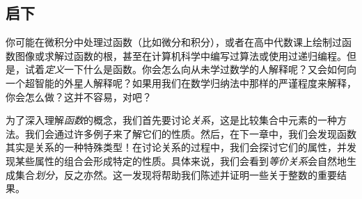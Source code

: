 
\subsection{启下}

你可能在微积分中处理过函数（比如微分和积分），或者在高中代数课上绘制过函数图像或求解过函数的根，甚至在计算机科学中编写过算法或使用过递归编程。但是，试着\emph{定义}一下什么是函数。你会怎么向从未学过数学的人解释呢？又会如何向一个超智能的外星人解释呢？如果用我们在数学归纳法中那样的严谨程度来解释，你会怎么做？这并不容易，对吧？

为了深入理解\emph{函数}的概念，我们首先要讨论\emph{关系}，这是比较集合中元素的一种方法。我们会通过许多例子来了解它们的性质。然后，在下一章中，我们会发现函数其实是关系的一种特殊类型！在讨论关系的过程中，我们会探讨它们的属性，并发现某些属性的组合会形成特定的性质。具体来说，我们会看到\emph{等价关系}会自然地生成集合\emph{划分}，反之亦然。这一发现将帮助我们陈述并证明一些关于整数的重要结果。